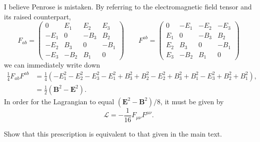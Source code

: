 \documentclass[../road-to-reality.tex]{subfiles}
\begin{document}
\begin{questions}
  \begin{solution}
    I believe Penrose is mistaken. By referring to the electromagnetic field tensor and its raised counterpart,
    \[
      F_{ab} = \begin{pmatrix} 0 & E_1 & E_2 & E_3 \\ -E_1 & 0 & -B_3 & B_2 \\
        -E_2 & B_3 & 0 & -B_1 \\ -E_3 & -B_2 & B_1 & 0 \end{pmatrix} \qquad
      F^{ab} = \begin{pmatrix} 0 & -E_1 & -E_2 & -E_3 \\ E_1 & 0 & -B_3 & B_2
        \\ E_2 & B_3 & 0 & -B_1 \\ E_3 & -B_2 & B_1 & 0 \end{pmatrix}
    \]
    we can immediately write down
    \begin{align*}
      \frac{1}{4}F_{ab}F^{ab} &= \frac{1}{4}(-E_1^2 - E_2^2 - E_3^2 - E_1^2 + B_3^2 + B_2^2 - E_2^2 + B_3^2 + B_1^2 - E_3^2 + B_2^2 + B_1^2), \\
      &= \frac{1}{2}(\mathbf{B}^2 - \mathbf{E}^2).
    \end{align*}
    In order for the Lagrangian to equal $(\mathbf{E}^2-\mathbf{B}^2)/8$, it
    must be given by
    \[
      \mathcal{L} = -\frac{1}{16}F_{\mu\nu}F^{\mu\nu}.
    \]
  \end{solution}


\question Show that this prescription is equivalent to that given in the main text.

\end{questions}
\end{document}
